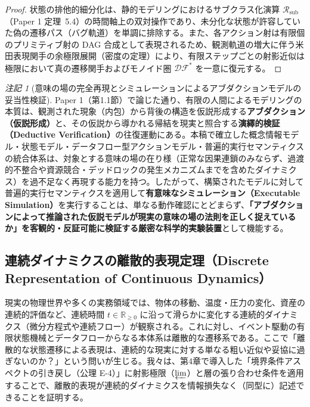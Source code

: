 \documentclass[11pt,a4paper]{ltjsarticle}
\theoremstyle{definition}
\theoremstyle{plain}
\theoremstyle{remark}
\newtheorem{remark}{注記}[section]
\newcommand{\DF}{\mathcal{DF}}
\begin{document}
\begin{proof}
状態の排他的細分化は、静的モデリングにおけるサブクラス化演算 $\mathcal{R}_{\mathrm{sub}}$（Paper 1 定理~5.4）の時間軸上の双対操作であり、未分化な状態が許容していた偽の遷移パス（バグ軌道）を単調に排除する。また、各アクション射は有限個のプリミティブ射の DAG 合成として表現されるため、観測軌道の増大に伴う米田表現関手の余極限展開（密度の定理）により、有限ステップごとの射影近似は極限において真の遷移関手およびモノイド圏 $\DF^*$ を一意に復元する。
\end{proof}

\begin{remark}[意味の場の完全再現とシミュレーションによるアブダクションモデルの妥当性検証]\label{rem:simulation}
Paper 1（第1.1節）で論じた通り、有限の人間によるモデリングの本質は、観測された現象（内包）から背後の構造を仮説形成する\textbf{アブダクション（仮説形成）}と、その仮説から導かれる帰結を現実と照合する\textbf{演繹的検証（Deductive Verification）}の往復運動にある。本稿で確立した概念情報モデル・状態モデル・データフロー型アクションモデル・普遍的実行セマンティクスの統合体系は、対象とする意味の場の在り様（正常な因果連鎖のみならず、過渡的不整合や資源競合・デッドロックの発生メカニズムまでを含めたダイナミクス）を過不足なく再現する能力を持つ。したがって、構築されたモデルに対して普遍的実行セマンティクスを適用して\textbf{有意味なシミュレーション（Executable Simulation）}を実行することは、単なる動作確認にとどまらず、\textbf{「アブダクションによって推論された仮説モデルが現実の意味の場の法則を正しく捉えているか」を客観的・反証可能に検証する厳密な科学的実験装置}として機能する。
\end{remark}
\subsection{連続ダイナミクスの離散的表現定理（Discrete Representation of Continuous Dynamics）}\label{sec:continuous}
現実の物理世界や多くの実務領域では、物体の移動、温度・圧力の変化、資産の連続的評価など、連続時間 $t \in \mathbb{R}_{\ge 0}$ に沿って滑らかに変化する連続的ダイナミクス（微分方程式や連続フロー）が観察される。これに対し、イベント駆動の有限状態機械とデータフローからなる本体系は離散的な遷移系である。ここで「離散的な状態遷移による表現は、連続的な現実に対する単なる粗い近似や妥協に過ぎないのか？」という問いが生じる。我々は、第4章で導入した「境界条件アスペクトの引き戻し（公理 E-4）」に射影極限（$\varprojlim$）と層の張り合わせ条件を適用することで、離散的表現が連続的ダイナミクスを情報損失なく（同型に）記述できることを証明する。
\end{document}
